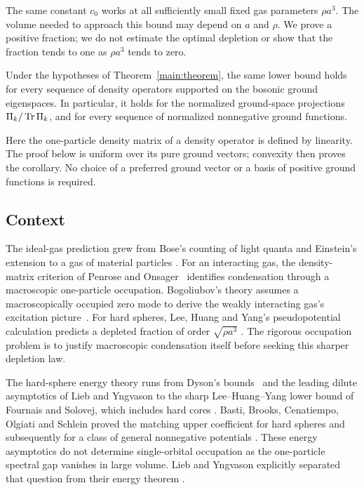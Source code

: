 The same constant $c_0$ works at all sufficiently small fixed gas
parameters $\rho a^3$. The volume needed to approach this bound may
depend on $a$ and $\rho$. We prove a positive fraction; we do not
estimate the optimal depletion or show that the fraction tends to one
as $\rho a^3$ tends to zero.

\begin{corollary}\label{main:mixed}
Under the hypotheses of Theorem~\ref{main:theorem}, the same lower
bound holds for every sequence of density operators supported on the
bosonic ground eigenspaces. In particular, it holds for the normalized
ground-space projections $\Pi_k/\operatorname{Tr}\Pi_k$, and for every sequence of
normalized nonnegative ground functions.
\end{corollary}

Here the one-particle density matrix of a density operator is defined by
linearity. The proof below is uniform over its pure ground vectors;
convexity then proves the corollary. No choice of a preferred ground
vector or a basis of positive ground functions is required.

\subsection{Context}

The ideal-gas prediction grew from Bose's counting of light quanta and
Einstein's extension to a gas of material particles
\cite{Bose1924,Einstein1924IdealGas,Einstein1925IdealGas}.
For an interacting gas, the density-matrix criterion of Penrose and
Onsager~\cite{PenroseOnsager1956} identifies condensation through a
macroscopic one-particle occupation. Bogoliubov's theory assumes a
macroscopically occupied zero mode to derive the weakly interacting gas's
excitation picture~\cite[pp.~24--25]{Bogoliubov1947}. For hard spheres,
Lee, Huang and Yang's pseudopotential calculation predicts a depleted
fraction of order $\sqrt{\rho a^3}$
\cite[Section~III]{LeeHuangYang1957}. The rigorous occupation problem is
to justify macroscopic condensation itself before seeking this sharper
depletion law.

The hard-sphere energy theory runs from Dyson's bounds~\cite{Dyson1957}
and the leading dilute asymptotics of Lieb and Yngvason
\cite{LiebYngvason1998} to the sharp Lee--Huang--Yang lower bound of
Fournais and Solovej, which includes hard cores
\cite{FournaisSolovej2023}. Basti, Brooks, Cenatiempo, Olgiati and
Schlein proved the matching upper coefficient for hard spheres and
subsequently for a class of general nonnegative potentials
\cite{BastiEtAl2026HardSpheres,BastiEtAl2026GeneralPotentials}.
These energy asymptotics do not determine single-orbital occupation as
the one-particle spectral gap vanishes in large volume. Lieb and
Yngvason explicitly separated that question from their energy theorem
\cite{LiebYngvason1998}.

